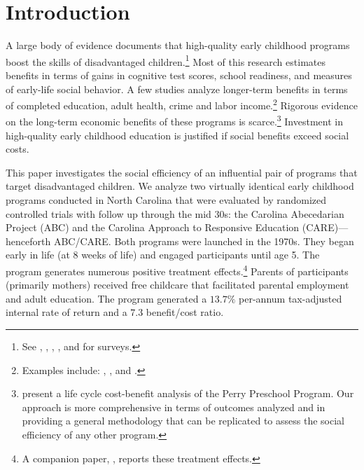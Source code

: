 \clearpage

\restoregeometry
\doublespacing
\setcounter{page}{1}

\section{Introduction}

\noindent A large body of evidence documents that high-quality early childhood programs boost the skills of disadvantaged children.\footnote{See \citet{Blau_Currie_2006_HEE}, \citet{Cunha_Heckman_ea_2006_HEE}, \citet{Duncan_Magnuson_2013_JEP}, \citet{Almond-Currie_2011_JEP}, and \citet{Elango_Hojman_etal_2016_Early-Edu} for surveys.} Most of this research estimates benefits in terms of gains in cognitive test scores, school readiness, and measures of early-life social behavior. A few studies analyze longer-term benefits in terms of completed education, adult health, crime and labor income.\footnote{Examples include: \citet{Heckman_Moon_etal_2010_QE}, \citet{Havnes_Mogstad_2011_AEJEP}, and \citet{Campbell_Conti_etal_2014_EarlyChildhoodInvestments}.} Rigorous evidence on the long-term economic benefits of these programs is scarce.\footnote{\citet{Heckman_Moon_etal_2010_RateofReturn} present a life cycle cost-benefit analysis of the Perry Preschool Program. Our approach is more comprehensive in terms of outcomes analyzed and in providing a general methodology that can be replicated to assess the social efficiency of any other program.} Investment in high-quality early childhood education is justified if social benefits exceed social costs.

This paper investigates the social efficiency of an influential pair of programs that target disadvantaged children. We analyze two virtually identical early childhood programs conducted in North Carolina that were evaluated by randomized controlled trials with follow up through the mid 30s: the Carolina Abecedarian Project (ABC) and the Carolina Approach to Responsive Education (CARE)---henceforth ABC/CARE. Both programs were launched in the 1970s. They began early in life (at 8 weeks of life) and engaged participants until age 5. The program generates numerous positive treatment effects.\footnote{A companion paper, \citet{Garcia_Heckman_Ziff_2017_Gender-Diff_UNPUBLISHED}, reports these treatment effects.} Parents of participants (primarily mothers) received free childcare that facilitated parental employment and adult education. The program generated a $13.7\%$ per-annum tax-adjusted internal rate of return and a $7.3$ benefit/cost ratio.

